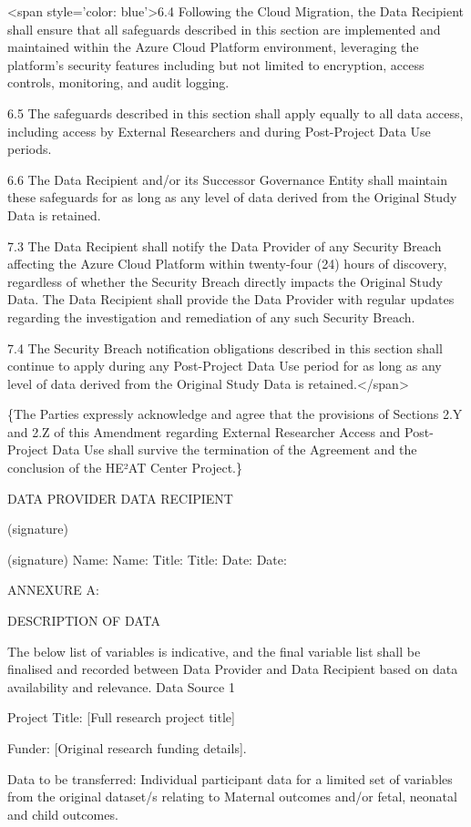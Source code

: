 \documentclass[12pt,letterpaper]{article}
\newcommand{\added}[1]{\textcolor{addcolor}{#1}}
\begin{document}
<span style='color: blue'>6.4 Following the Cloud Migration, the Data Recipient shall ensure that all safeguards described in this section are implemented and maintained within the Azure Cloud Platform environment, leveraging the platform's security features including but not limited to encryption, access controls, monitoring, and audit logging.

6.5 The safeguards described in this section shall apply equally to all data access, including access by External Researchers and during Post-Project Data Use periods.

6.6 The Data Recipient and/or its Successor Governance Entity shall maintain these safeguards for as long as any level of data derived from the Original Study Data is retained.

7.3 The Data Recipient shall notify the Data Provider of any Security Breach affecting the Azure Cloud Platform within twenty-four (24) hours of discovery, regardless of whether the Security Breach directly impacts the Original Study Data. The Data Recipient shall provide the Data Provider with regular updates regarding the investigation and remediation of any such Security Breach.

7.4 The Security Breach notification obligations described in this section shall continue to apply during any Post-Project Data Use period for as long as any level of data derived from the Original Study Data is retained.</span>

\added\{The Parties expressly acknowledge and agree that the provisions of Sections 2.Y and 2.Z of this Amendment regarding External Researcher Access and Post-Project Data Use shall survive the termination of the Agreement and the conclusion of the HE²AT Center Project.\}

DATA PROVIDER	DATA RECIPIENT

(signature)	 

(signature) Name:	Name: Title:	Title: Date:	Date:

ANNEXURE A:

DESCRIPTION OF DATA

The below list of variables is indicative, and the final variable list shall be finalised and recorded between Data Provider and Data Recipient based on data availability and relevance. Data Source 1

Project Title: [Full research project title]	

Funder: [Original research funding details].		

Data to be transferred: Individual participant data for a limited set of variables from the original dataset/s relating to Maternal outcomes and/or fetal, neonatal and child outcomes.
\end{document}
